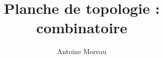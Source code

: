 \documentclass[a4paper,10pt]{article}
\title{Planche de topologie : combinatoire}
\author{Antoine Moreau}
\begin{document}
\maketitle

\begin{abstract}

\end{abstract}

%
\end{document}
